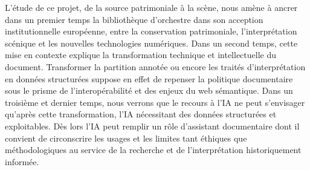 \bigskip L'étude de ce projet, de la source patrimoniale à la scène, nous amène à ancrer dans un premier temps la bibliothèque d'orchestre dans son acception institutionnelle européenne, entre la conservation patrimoniale, l'interprétation scénique et les nouvelles technologies numériques. Dans un second temps, cette mise en contexte explique la transformation technique et intellectuelle du document. Transformer la partition annotée ou encore les traités d'interprétation en données structurées suppose en effet de repenser la politique documentaire sous le prisme de l'interopérabilité et des enjeux du web sémantique. Dans un troisième et dernier temps, nous verrons que le recours à l'IA ne peut s'envisager qu'après cette transformation, l'IA nécessitant des données structurées et exploitables. Dès lors l'IA peut remplir un rôle d'assistant documentaire dont il convient de circonscrire les usages et les limites tant éthiques que méthodologiques au service de la recherche et de l'interprétation historiquement informée.